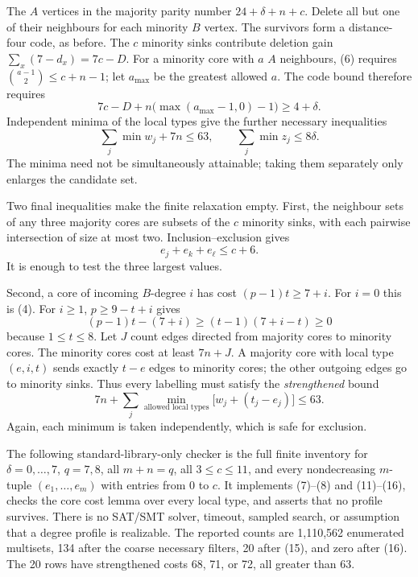 \documentclass[11pt,a4paper]{article}
\begin{document}
The \(A\) vertices in the majority parity number \(24+\delta+n+c\). Delete all but one of their neighbours for each minority \(B\) vertex. The survivors form a distance-four code, as before. The \(c\) minority sinks contribute deletion gain \(\sum_x(7-d_x)=7c-D\). For a minority core with \(a\) \(A\) neighbours, (6) requires \(\binom{a-1}{2}\le c+n-1\); let \(a_{\max}\) be the greatest allowed \(a\). The code bound therefore requires
\[
7c-D+n\bigl(\max(a_{\max}-1,0)-1\bigr)\ge4+\delta. \tag{13}
\]
Independent minima of the local types give the further necessary inequalities
\[
\sum_j\min w_j+7n\le63,\qquad
\sum_j\min z_j\le8\delta. \tag{14}
\]
The minima need not be simultaneously attainable; taking them separately only enlarges the candidate set.

Two final inequalities make the finite relaxation empty. First, the neighbour sets of any three majority cores are subsets of the \(c\) minority sinks, with each pairwise intersection of size at most two. Inclusion--exclusion gives
\[
e_j+e_k+e_\ell\le c+6. \tag{15}
\]
It is enough to test the three largest values.

Second, a core of incoming \(B\)-degree \(i\) has cost \((p-1)t\ge7+i\). For \(i=0\) this is (4). For \(i\ge1\), \(p\ge9-t+i\) gives
\[
(p-1)t-(7+i)\ge(t-1)(7+i-t)\ge0
\]
because \(1\le t\le8\). Let \(J\) count edges directed from majority cores to minority cores. The minority cores cost at least \(7n+J\). A majority core with local type \((e,i,t)\) sends exactly \(t-e\) edges to minority cores; the other outgoing edges go to minority sinks. Thus every labelling must satisfy the \emph{strengthened} bound
\[
7n+\sum_j\min_{\text{allowed local types}}\bigl[w_j+(t_j-e_j)\bigr]\le63. \tag{16}
\]
Again, each minimum is taken independently, which is safe for exclusion.

The following standard-library-only checker is the full finite inventory for \(\delta=0,\ldots,7\), \(q=7,8\), all \(m+n=q\), all \(3\le c\le11\), and every nondecreasing \(m\)-tuple \((e_1,\ldots,e_m)\) with entries from \(0\) to \(c\). It implements (7)--(8) and (11)--(16), checks the core cost lemma over every local type, and asserts that no profile survives. There is no SAT/SMT solver, timeout, sampled search, or assumption that a degree profile is realizable. The reported counts are 1,110,562 enumerated multisets, 134 after the coarse necessary filters, 20 after (15), and zero after (16). The 20 rows have strengthened costs 68, 71, or 72, all greater than 63.
\end{document}
